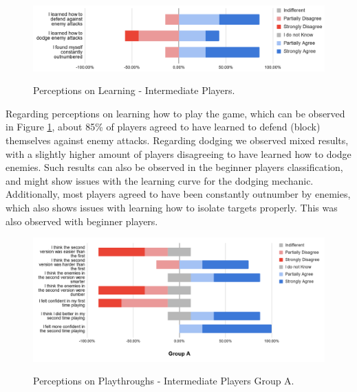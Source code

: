 \begin{figure}[!ht]
    \begin{center}
    \caption{Perceptions on Learning - Intermediate Players.}
        \includegraphics[width=36em]{figures/fig-perception-learning-intermediate-players.png}
        \label{fig:perception-learning-intermediate-players}
    \end{center}
\end{figure}

Regarding perceptions on learning how to play the game, which can be observed in Figure \ref{fig:perception-learning-intermediate-players}, about 85\% of players agreed to have learned to defend (block) themselves against enemy attacks. Regarding dodging we observed mixed results, with a slightly higher amount of players disagreeing to have learned how to dodge enemies. Such results can also be observed in the beginner players classification, and might show issues with the learning curve for the dodging mechanic. Additionally, most players agreed to have been constantly outnumber by enemies, which also shows issues with learning how to isolate targets properly. This was also observed with beginner players.

\begin{figure}[!ht]
    \begin{center}
    \caption{Perceptions on Playthroughs - Intermediate Players Group A.}
        \includegraphics[width=36em]{figures/fig-perception-versions-intermediate-players-group-a.png}
        \label{fig:perception-playthrough-intermediate-players-group-a}
    \end{center}
\end{figure}

